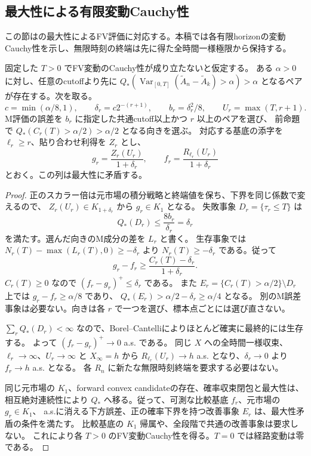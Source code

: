\subsection{最大性による有限変動Cauchy性}\label{sec:fv-cauchy}
この節は\cite[Lemma 4.11]{DS}の最大性によるFV評価に対応する。本稿では各有限horizonの変動Cauchy性を示し、無限時刻の終端は先に得た全時間一様極限から保持する。

\begin{proposition}[正規化した終端差と最大性矛盾]
固定した $T>0$ でFV変動のCauchy性が成り立たないと仮定する。
ある $\alpha>0$ に対し、任意のcutoffより先に
$Q_*(\operatorname{Var}_{[0,T]}(\widetilde A_n-\widetilde A_k)>\alpha)>\alpha$
となるペアが存在する。次を取る。
\[
 c=\min(\alpha/8,1),\qquad
 \delta_r=c2^{-(r+1)},\qquad b_r=\delta_r^2/8,\qquad
 U_r=\max(T,r+1).
\]
M評価の誤差を $b_r$ に指定した共通cutoff以上かつ $r$ 以上のペアを選び、
前命題で $Q_*(C_r(T)>\alpha/2)>\alpha/2$ となる向きを選ぶ。
対応する基底の添字を $\ell_r\geq r$、貼り合わせ利得を $Z_r$ とし、
\[
 g_r=\frac{Z_r(U_r)}{1+\delta_r},\qquad
 f_r=\frac{R_{\ell_r}(U_r)}{1+\delta_r}
\]
とおく。この列は最大性に矛盾する。
\end{proposition}
\begin{proof}
正のスカラー倍は元市場の積分戦略と終端値を保ち、下界を同じ係数で変えるので、
$Z_r(U_r)\in K_{1+\delta_r}$ から $g_r\in K_1$ となる。
失敗事象 $D_r=\{\tau_r\leq T\}$ は
\[
 Q_*(D_r)\leq\frac{8b_r}{\delta_r}=\delta_r
\]
を満たす。選んだ向きのM成分の差を $L_r$ と書く。
生存事象では $N_r(T)-\max(L_r(T),0)\geq-\delta_r$ より
$N_r(T)\geq-\delta_r$ である。従って
\[
 g_r-f_r\geq\frac{C_r(T)-\delta_r}{1+\delta_r}.
\]
$C_r(T)\geq0$ なので $(f_r-g_r)^+\leq\delta_r$ である。
また $E_r=\{C_r(T)>\alpha/2\}\setminus D_r$ 上では
$g_r-f_r\geq\alpha/8$ であり、
$Q_*(E_r)>\alpha/2-\delta_r\geq\alpha/4$ となる。
別のM誤差事象は必要ない。向きは各 $r$ で一つを選び、標本点ごとには選び直さない。

$\sum_r Q_*(D_r)<\infty$ なので、Borel--Cantelliによりほとんど確実に最終的には生存する。
よって $(f_r-g_r)^+\to0$ a.s. である。
同じ $X$ への全時間一様収束、$\ell_r\to\infty$、$U_r\to\infty$ と $X_\infty=h$ から
$R_{\ell_r}(U_r)\to h$ a.s. となり、$\delta_r\to0$ より $f_r\to h$ a.s. となる。
各 $R_n$ に新たな無限時刻終端を要求する必要はない。

同じ元市場の $K_1$、forward convex candidateの存在、確率収束閉包と最大性は、
相互絶対連続性により $Q_*$ へ移る。従って、可測な比較基底 $f_r$、元市場の $g_r\in K_1$、
a.s.に消える下方誤差、正の確率下界を持つ改善事象 $E_r$ は、最大性矛盾の条件を満たす。
比較基底の $K_1$ 帰属や、全段階で共通の改善事象は要求しない。
これにより各 $T>0$ のFV変動Cauchy性を得る。$T=0$ では経路変動は零である。
\end{proof}

